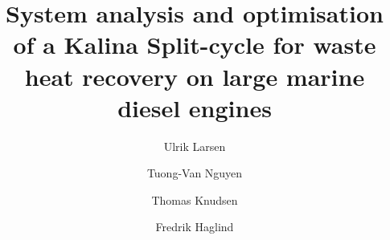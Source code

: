 \documentclass[review,3p]{elsarticle}
\begin{document}
\begin{frontmatter}



\title{System analysis and optimisation of a Kalina Split-cycle for waste heat recovery on large marine diesel engines}


\author{Ulrik Larsen} 
\author{Tuong-Van Nguyen\corref{}}
\author{Thomas Knudsen\corref{}}
\author{Fredrik Haglind\corref{}} 

\address{Section of Thermal Energy, Department of Mechanical Engineering, Technical University of Denmark,\\ Building 403, Nils Koppels All\'{e}, 2800 Kongens Lyngby, Denmark}


\end{frontmatter}
\end{document}
